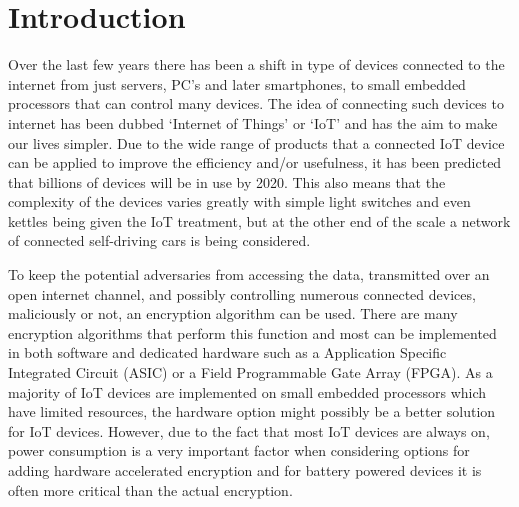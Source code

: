 \documentclass[12pt,twoside,a4paper]{report}
\begin{document}
    \chapter{Introduction}
    \label{chapter:intro}
    Over the last few years there has been a shift in type of devices connected to the internet from just servers, PC's and later smartphones, to small embedded processors that can control many devices.
    The idea of connecting such devices to internet has been dubbed `Internet of Things' or `IoT' and has the aim to make our lives simpler.
    Due to the wide range of products that a connected IoT device can be applied to improve the efficiency and/or usefulness, it has been predicted that billions of devices will be in use by 2020\cite{Evans2011}.
    This also means that the complexity of the devices varies greatly with simple light switches and even kettles being given the IoT treatment, but at the other end of the scale a network of connected self-driving cars is being considered\cite{Hegde}.
    
    To keep the potential adversaries from accessing the data, transmitted over an open internet channel, and possibly controlling numerous connected devices, maliciously or not, an encryption algorithm can be used.
    There are many encryption algorithms that perform this function and most can be implemented in both software and dedicated hardware such as a Application Specific Integrated Circuit (ASIC) or a Field Programmable Gate Array (FPGA).
    As a majority of IoT devices are implemented on small embedded processors which have limited resources, the hardware option might possibly be a better solution for IoT devices. 
    However, due to the fact that most IoT devices are always on, power consumption is a very important factor when considering options for adding hardware accelerated encryption and for battery powered devices it is often more critical than the actual encryption.
    
\end{document}
